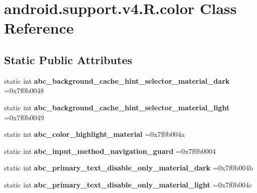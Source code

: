\hypertarget{classandroid_1_1support_1_1v4_1_1R_1_1color}{}\section{android.\+support.\+v4.\+R.\+color Class Reference}
\label{classandroid_1_1support_1_1v4_1_1R_1_1color}
\subsection*{Static Public Attributes}
\begin{DoxyCompactItemize}
\item 
\mbox{\label{classandroid_1_1support_1_1v4_1_1R_1_1color_a9fed29946bcdadc4e454eb9fae4d985e}} 
static int {\bfseries abc\+\_\+background\+\_\+cache\+\_\+hint\+\_\+selector\+\_\+material\+\_\+dark} =0x7f0b0048
\item 
\mbox{\label{classandroid_1_1support_1_1v4_1_1R_1_1color_aef874dbbbc29f1ce406c671413b2257c}} 
static int {\bfseries abc\+\_\+background\+\_\+cache\+\_\+hint\+\_\+selector\+\_\+material\+\_\+light} =0x7f0b0049
\item 
\mbox{\label{classandroid_1_1support_1_1v4_1_1R_1_1color_af08462b19ed46d0f000236ffbe7cd857}} 
static int {\bfseries abc\+\_\+color\+\_\+highlight\+\_\+material} =0x7f0b004a
\item 
\mbox{\label{classandroid_1_1support_1_1v4_1_1R_1_1color_a6204c15297878705649d8ffb39741340}} 
static int {\bfseries abc\+\_\+input\+\_\+method\+\_\+navigation\+\_\+guard} =0x7f0b0004
\item 
\mbox{\label{classandroid_1_1support_1_1v4_1_1R_1_1color_a16b29fa1ecad4fa44d932be906b33d31}} 
static int {\bfseries abc\+\_\+primary\+\_\+text\+\_\+disable\+\_\+only\+\_\+material\+\_\+dark} =0x7f0b004b
\item 
\mbox{\label{classandroid_1_1support_1_1v4_1_1R_1_1color_aba21c9afee0be30ac4c7bd50f3d7e8c5}} 
static int {\bfseries abc\+\_\+primary\+\_\+text\+\_\+disable\+\_\+only\+\_\+material\+\_\+light} =0x7f0b004c

\end{DoxyCompactItemize}
